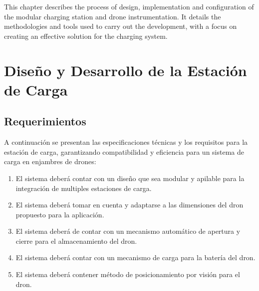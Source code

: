
This chapter describes the process of design, implementation and configuration of the modular charging station and drone instrumentation. It details the methodologies and tools used to carry out the development, with a focus on creating an effective solution for the charging system.
\section{Diseño y Desarrollo de la Estación de Carga}
\subsection{Requerimientos}
A continuación se presentan las especificaciones técnicas y los requisitos para la estación de carga, garantizando compatibilidad y eficiencia para un sistema de carga en enjambres de drones:
    \begin{enumerate}
        \item El sistema deberá contar con un diseño que sea modular y apilable para la integración de multiples estaciones de carga. 
        \item El sistema deberá tomar en cuenta y adaptarse a las dimensiones del dron propuesto para la aplicación.
        \item El sistema deberá de contar con un mecanismo automático de apertura y cierre para el almacenamiento del dron.
        \item El sistema deberá contar con un mecanismo de carga para la batería del dron.
        \item El sistema deberá contener método de posicionamiento por visión para el dron. 
    \end{enumerate}

